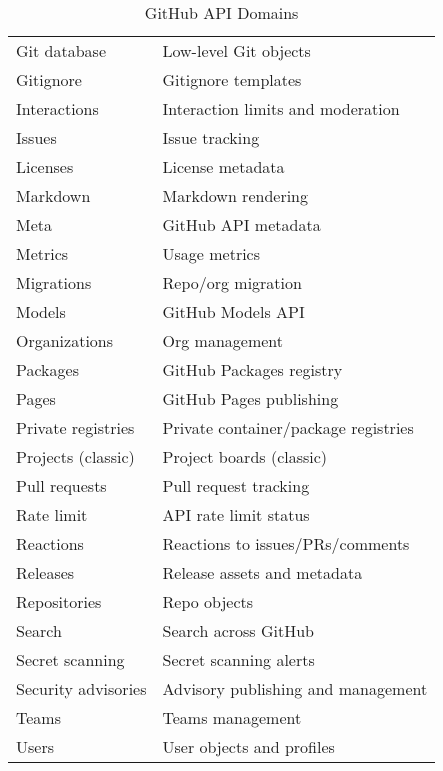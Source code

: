 \documentclass[openany, 12pt]{book}
\begin{document}
\begin{table}[h]
\begin{tabular}{ll}
		Git database           & Low-level Git objects                \\
		Gitignore              & Gitignore templates                  \\
		Interactions           & Interaction limits and moderation    \\
		Issues                 & Issue tracking                       \\
		Licenses               & License metadata                     \\
		Markdown               & Markdown rendering                   \\
		Meta                   & GitHub API metadata                  \\
		Metrics                & Usage metrics                        \\
		Migrations             & Repo/org migration                   \\
		Models                 & GitHub Models API                    \\
		Organizations          & Org management                       \\
		Packages               & GitHub Packages registry             \\
		Pages                  & GitHub Pages publishing              \\
		Private registries     & Private container/package registries \\
		Projects (classic)     & Project boards (classic)             \\
		Pull requests          & Pull request tracking                \\
		Rate limit             & API rate limit status                \\
		Reactions              & Reactions to issues/PRs/comments     \\
		Releases               & Release assets and metadata          \\
		Repositories           & Repo objects                         \\
		Search                 & Search across GitHub                 \\
		Secret scanning        & Secret scanning alerts               \\
		Security advisories    & Advisory publishing and management   \\
		Teams                  & Teams management                     \\
		Users                  & User objects and profiles            \\
		\bottomrule
	\end{tabular}
	\caption{GitHub API Domains}
\end{table}
\end{document}
